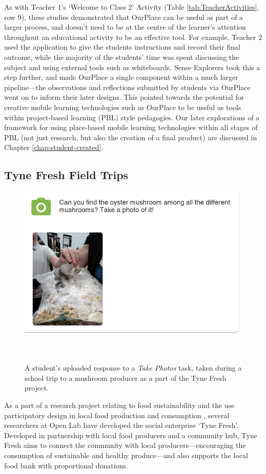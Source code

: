 As with Teacher 1's `Welcome to Class 2' Activity (Table \ref{tab:TeacherActivities}, row 9), these studies demonstrated that OurPlace can be useful as part of a larger process, and doesn't need to be at the centre of the learner's attention throughout an educational activity to be an effective tool. For example, Teacher 2 used the application to give the students instructions and record their final outcome, while the majority of the students' time was spent discussing the subject and using external tools such as whiteboards. Sense Explorers took this a step further, and made OurPlace a single component within a much larger pipeline---the observations and reflections submitted by students via OurPlace went on to inform their later designs. This pointed towards the potential for creative mobile learning technologies such as OurPlace to be useful as tools within project-based learning (PBL) style pedagogies. Our later explorations of a framework for using place-based mobile learning technologies within all stages of PBL (not just research, but also the creation of a final product) are discussed in Chapter \ref{chap:student-created}.

\subsection*{Tyne Fresh Field Trips}
\label{sec:TyneFresh}

\begin{figure}
  \centering
  \includegraphics[width=0.7\columnwidth]{images/chapter07/mushroom.png}
  \caption[A student's uploaded photo from a visit to a mushroom producer]{A student's uploaded response to a \textit{Take Photos} task, taken during a school trip to a mushroom producer as a part of the Tyne Fresh project.}~\label{fig:MushroomTrip}
\end{figure}

As a part of a research project relating to food sustainability and the use participatory design in local food production and consumption \citep{Prost2019}, several researchers at Open Lab have developed the social enterprise `Tyne Fresh'. Developed in partnership with local food producers and a community hub, Tyne Fresh aims to connect the community with local producers---encouraging the consumption of sustainable and healthy produce---and also supports the local food bank with proportional donations.

